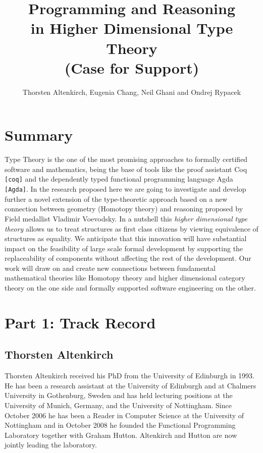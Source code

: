 \documentclass[a4paper]{article}
\title{Programming and Reasoning\\ in Higher Dimensional Type Theory \\
\LARGE (Case for Support)}
\author{Thorsten Altenkirch, Eugenia Chang, Neil Ghani and Ondrej Rypacek}
\date{}
\renewcommand{\cite}[1]{{\tt[#1]}}
\begin{document}
\maketitle
\section*{Summary}
Type Theory is the one of the most promising approaches to formally
certified software and mathematics, being the base of tools like the
proof assistant Coq \cite{coq} and the dependently typed functional
programming language Agda \cite{Agda}. In the research proposed here
we are going to investigate and develop further a novel extension of
the type-theoretic approach based on a new connection between geometry
(Homotopy theory) and reasoning proposed by Field medallist Vladimir
Voevodsky. In a nutshell this \emph{higher dimensional type theory}
allows us to treat structures as first class citizens by viewing
equivalence of structures as equality. We anticipate that this
innovation will have substantial impact on the feasibility of large scale
formal development by supporting the replaceability of components
without affecting the rest of the development. Our work will draw on
and create new connections between fundamental mathematical theories
like Homotopy theory and higher dimensional category theory on the one
side and formally supported software engineering on the other.


\section*{Part 1: Track Record}

\subsection*{Thorsten Altenkirch}
Thorsten Altenkirch received his PhD from the University of
Edinburgh in 1993. He has been a research assistant at the University of
Edinburgh and at Chalmers University in Gothenburg, Sweden and has
held lecturing positions at the University of Munich, Germany, and the
University of Nottingham. Since October 2006 he has been a Reader in
Computer Science at the University of Nottingham and in October
2008 he founded the Functional Programming Laboratory together with
Graham Hutton. Altenkirch and Hutton are now jointly leading the
laboratory.
\end{document}
